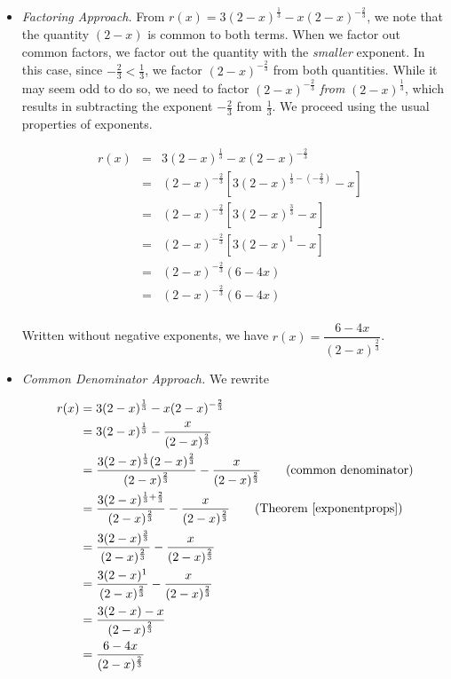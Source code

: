 \begin{ex}
\begin{enumerate}
\begin{itemize}
\item  \textit{Factoring Approach.}  From $r(x) = 3 (2-x)^{\frac{1}{3}} - x (2-x)^{-\frac{2}{3}}$, we note that the quantity $(2-x)$ is common to both terms.  When we factor out common factors, we factor out the quantity with the \textit{smaller} exponent.  In this case, since $-\frac{2}{3} < \frac{1}{3}$, we factor $(2-x)^{-\frac{2}{3}}$ from both quantities.  While it may seem odd to do so, we need to factor $(2-x)^{-\frac{2}{3}}$ \textit{from} $(2-x)^{\frac{1}{3}}$, which results in subtracting the exponent $-\frac{2}{3}$ from $\frac{1}{3}$.  We proceed using the usual properties of exponents.

\[ \begin{array}{rclr}

r(x)  & = & 3 (2-x)^{\frac{1}{3}} - x (2-x)^{-\frac{2}{3}} & \\ [3pt]
      & = & (2-x)^{-\frac{2}{3}} \left[ 3 (2-x)^{\frac{1}{3} - \left(-\frac{2}{3}\right)} - x\right] & \\ [6pt]
      & = & (2-x)^{-\frac{2}{3}}\left[3(2-x)^{\frac{3}{3}} - x\right] & \\ [3pt]
      & = & (2-x)^{-\frac{2}{3}}\left[3(2-x)^{1} - x\right] &  \\ [3pt]
      & = & (2-x)^{-\frac{2}{3}}\left(6-4x\right) & \\ [3pt]
      & = & (2-x)^{-\frac{2}{3}}\left(6-4x\right) & \\
      
\end{array}\]

Written without negative exponents, we have $r(x) = \dfrac{6-4x}{(2-x)^{\frac{2}{3}}}$.

\item \textit{Common Denominator Approach.}  We rewrite 

\begin{align*}
r(x)  & = 3 (2-x)^{\frac{1}{3}} - x (2-x)^{-\frac{2}{3}} \\
      & = 3 (2-x)^{\frac{1}{3}} - \dfrac{x}{(2-x)^{\frac{2}{3}}} \\
      & = \dfrac{3 (2-x)^{\frac{1}{3}}(2-x)^{\frac{2}{3}}}{(2-x)^{\frac{2}{3}}} - \dfrac{x}{(2-x)^{\frac{2}{3}}} \tag{common denominator} \\
      & = \dfrac{3 (2-x)^{\frac{1}{3} + \frac{2}{3}}}{(2-x)^{\frac{2}{3}}} - \dfrac{x}{(2-x)^{\frac{2}{3}}} \tag{Theorem \ref{exponentprops}}  \\
      & = \dfrac{3 (2-x)^{\frac{3}{3}}}{(2-x)^{\frac{2}{3}}} - \dfrac{x}{(2-x)^{\frac{2}{3}}} \\
      & = \dfrac{3 (2-x)^1}{(2-x)^{\frac{2}{3}}} - \dfrac{x}{(2-x)^{\frac{2}{3}}} \\
      & = \dfrac{3 (2-x) - x}{(2-x)^{\frac{2}{3}}} \\
      & = \dfrac{6-4x}{(2-x)^{\frac{2}{3}}} \\
\end{align*}


\end{itemize}
\end{enumerate}
\end{ex}
